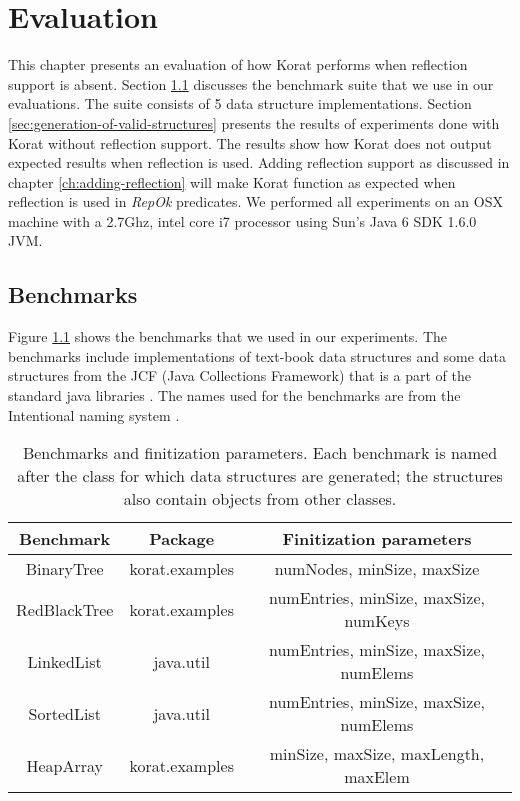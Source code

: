 \chapter{Evaluation}
\label{ch:evaluation}
This chapter presents an evaluation of how Korat performs when
reflection support is absent. Section \ref{sec:benchmarks} discusses
the benchmark suite that we use in our evaluations. The suite consists
of 5 data structure implementations. Section
\ref{sec:generation-of-valid-structures} presents the results of
experiments done with Korat without reflection support. The results
show how Korat does not output expected results when reflection is
used. Adding reflection support as discussed in chapter
\ref{ch:adding-reflection} will make Korat function as expected when
reflection is used in \emph{RepOk} predicates. We performed all
experiments on an OSX machine with a 2.7Ghz, intel core i7 processor
using Sun’s Java 6 SDK 1.6.0 JVM.



\section{Benchmarks}
\label{sec:benchmarks}
Figure \ref{fig:benchmarksAndFinitizationParams} shows the benchmarks
that we used in our experiments. The benchmarks include
implementations of text-book data structures and some data structures
from the JCF (Java Collections Framework) that is a part of the
standard java libraries \cite{Linden:2004:JJJ:993931}. The names used for the benchmarks
are from the Intentional naming system \cite{adjie1999design}.

\begin{table}[h]
\begin{tabular}{|c|c|c|}
\hline
Benchmark    & Package        & Finitization parameters                \\ \hline
BinaryTree   & korat.examples & numNodes, minSize, maxSize             \\ \hline
RedBlackTree & korat.examples & numEntries, minSize, maxSize, numKeys  \\ \hline
LinkedList   & java.util      & numEntries, minSize, maxSize, numElems \\ \hline
SortedList   & java.util      & numEntries, minSize, maxSize, numElems \\ \hline
HeapArray    & korat.examples & minSize, maxSize, maxLength, maxElem   \\ \hline
\end{tabular}
\caption{Benchmarks and finitization parameters. Each benchmark is
  named after the class for which data structures are generated; the
  structures also contain objects from other classes.}
\label{fig:benchmarksAndFinitizationParams}
\end{table}

